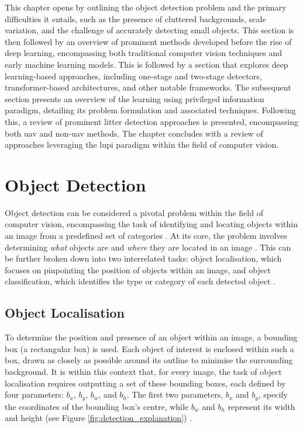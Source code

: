 This chapter opens by outlining the object detection problem and the primary difficulties it entails, such as the presence of cluttered backgrounds, scale variation, and the challenge of accurately detecting small objects. This section is then followed by an overview of prominent methods developed before the rise of deep learning, encompassing both traditional computer vision techniques and early machine learning models. This is followed by a section that explores deep learning-based approaches, including one-stage and two-stage detectors, transformer-based architectures, and other notable frameworks. The subsequent section presents an overview of the learning using privileged information paradigm, detailing its problem formulation and associated techniques. Following this, a review of prominent litter detection approaches is presented, encompassing both \gls{uav} and non-\gls{uav} methods. The chapter concludes with a review of approaches leveraging the \gls{lupi} paradigm within the field of computer vision.


\section{Object Detection}
\label{sec:2_detection}

Object detection can be considered a pivotal problem within the field of computer vision, encompassing the task of identifying and locating objects within an image from a predefined set of categories \cite{od_1}. At its core, the problem involves determining \textit{what} objects are and \textit{where} they are located in an image \cite{four_pillars_od}. This can be further broken down into two interrelated tasks: object localisation, which focuses on pinpointing the position of objects within an image, and object classification, which identifies the type or category of each detected object \cite{od_1, od_2, od_3}.

\subsection{Object Localisation}
\label{subsec:2_localisation}
To determine the position and presence of an object within an image, a bounding box (a rectangular box) is used. Each object of interest is enclosed within such a box, drawn as closely as possible around its outline to minimise the surrounding background. It is within this context that, for every image, the task of object localisation requires outputting a set of these bounding boxes, each defined by four parameters: \(b_x\), \(b_y\), \(b_w\), and \(b_h\). The first two parameters, \(b_x\) and \(b_y\), specify the coordinates of the bounding box's centre, while \(b_w\) and \(b_h\) represent its width and height (see Figure \ref{fig:detection_explanation}) \cite{od_2}.

